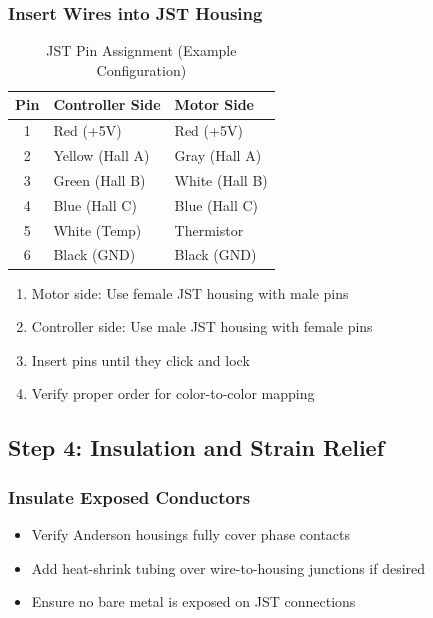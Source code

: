 \documentclass[11pt,a4paper]{article}
\begin{document}
\subsubsection{Insert Wires into JST Housing}

\begin{table}[H]
\centering
\caption{JST Pin Assignment (Example Configuration)}
\begin{tabular}{cll}
\toprule
\textbf{Pin} & \textbf{Controller Side} & \textbf{Motor Side} \\
\midrule
1 & Red (+5V) & Red (+5V) \\
2 & Yellow (Hall A) & Gray (Hall A) \\
3 & Green (Hall B) & White (Hall B) \\
4 & Blue (Hall C) & Blue (Hall C) \\
5 & White (Temp) & Thermistor \\
6 & Black (GND) & Black (GND) \\
\bottomrule
\end{tabular}
\end{table}

\begin{enumerate}
    \item Motor side: Use female JST housing with male pins
    \item Controller side: Use male JST housing with female pins
    \item Insert pins until they click and lock
    \item Verify proper order for color-to-color mapping
\end{enumerate}

\subsection{Step 4: Insulation and Strain Relief}

\subsubsection{Insulate Exposed Conductors}
\begin{itemize}
    \item Verify Anderson housings fully cover phase contacts
    \item Add heat-shrink tubing over wire-to-housing junctions if desired
    \item Ensure no bare metal is exposed on JST connections
\end{itemize}
\end{document}
